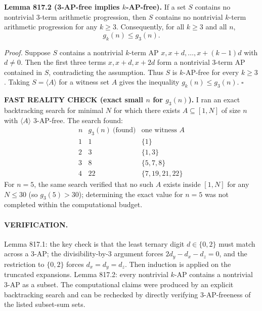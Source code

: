 \textbf{Lemma 817.2 (3-AP-free implies $k$-AP-free).}
If a set $S$ contains no nontrivial $3$-term arithmetic progression, then $S$ contains no nontrivial $k$-term arithmetic progression for any $k\ge3$.
Consequently, for all $k\ge3$ and all $n$,
\[
g_k(n) \le g_3(n).
\]

\emph{Proof.}
Suppose $S$ contains a nontrivial $k$-term AP $x,x+d,\dots,x+(k-1)d$ with $d\ne0$.
Then the first three terms $x,x+d,x+2d$ form a nontrivial 3-term AP contained in $S$, contradicting the assumption.
Thus $S$ is $k$-AP-free for every $k\ge3$.
Taking $S=\langle A\rangle$ for a witness set $A$ gives the inequality $g_k(n)\le g_3(n)$.
\hfill $\square$

\textbf{FAST REALITY CHECK (exact small $n$ for $g_3(n)$).}
I ran an exact backtracking search for minimal $N$ for which there exists $A\subseteq[1,N]$ of size $n$ with $\langle A\rangle$ 3-AP-free.
The search found:
\[
\begin{array}{c|c|c}
 n & g_3(n)\ \text{(found)} & \text{one witness }A\\\hline
 1 & 1 & \{1\}\\
 2 & 3 & \{1,3\}\\
 3 & 8 & \{5,7,8\}\\
 4 & 22 & \{7,19,21,22\}
\end{array}
\]
For $n=5$, the same search verified that no such $A$ exists inside $[1,N]$ for any $N\le 30$ (so $g_3(5)>30$); determining the exact value for $n=5$ was not completed within the computational budget.

\paragraph{VERIFICATION.}
Lemma 817.1: the key check is that the least ternary digit $d\in\{0,2\}$ must match across a 3-AP; the divisibility-by-$3$ argument forces $2d_y-d_x-d_z=0$, and the restriction to $\{0,2\}$ forces $d_x=d_y=d_z$. Then induction is applied on the truncated expansions.
Lemma 817.2: every nontrivial $k$-AP contains a nontrivial 3-AP as a subset.
The computational claims were produced by an explicit backtracking search and can be rechecked by directly verifying 3-AP-freeness of the listed subset-sum sets.

